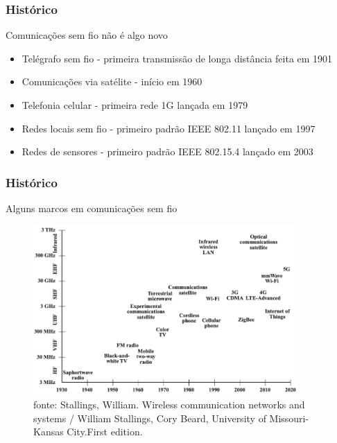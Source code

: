 \documentclass[10pt,xcolor=table]{beamer}
\begin{document}
\begin{frame}
	\frametitle{Histórico}
    \begin{block}{Comunicações sem fio não é algo novo}
		\begin{itemize}
			\item Telégrafo sem fio - primeira transmissão de longa distância feita em 1901
            \vspace{2mm}
            \item Comunicações via satélite - início em 1960
            \vspace{2mm}
            \item Telefonia celular - primeira rede 1G lançada em 1979
            \vspace{2mm}
            \item Redes locais sem fio - primeiro padrão IEEE 802.11 lançado em 1997
            \vspace{2mm}
            \item Redes de sensores - primeiro padrão IEEE 802.15.4 lançado em 2003
		\end{itemize}
	\end{block}

\end{frame}

\begin{frame}
	\frametitle{Histórico}
     Alguns marcos em comunicações sem fio\\
     \vspace{2mm}
	\begin{figure}[htbp]
	\includegraphics[width=0.9\textwidth]{figuras/milestonesredessemfio.png}\\
 	\tiny 
  fonte: Stallings, William. Wireless communication networks and systems / William Stallings, Cory Beard, University of Missouri-Kansas City.First edition.
	\end{figure}

\end{frame}
\end{document}

